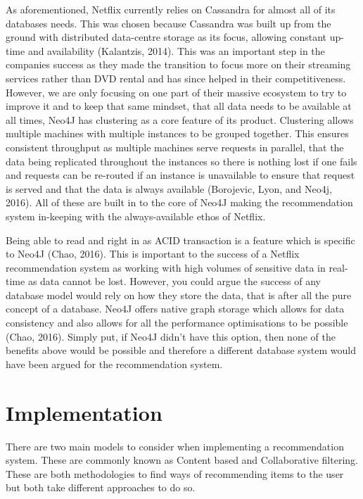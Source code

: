\documentclass[a4paper]{article}
\begin{document}
As aforementioned, Netflix currently relies on Cassandra for almost all of its databases needs. This was chosen because Cassandra was built up from the ground with distributed data-centre storage as its focus, allowing constant up-time and availability (Kalantzis, 2014). This was an important step in the companies success as they made the transition to focus more on their streaming services rather than DVD rental and has since helped in their competitiveness. However, we are only focusing on one part of their massive ecosystem to try to improve it and to keep that same mindset, that all data needs to be available at all times, Neo4J has clustering as a core feature of its product. Clustering allows multiple machines with multiple instances to be grouped together. This ensures consistent throughput as multiple machines serve requests in parallel, that the data being replicated throughout the instances so there is nothing lost if one fails and requests can be re-routed if an instance is unavailable to ensure that request is served and that the data is always available (Borojevic, Lyon, and Neo4j, 2016). All of these are built in to the core of Neo4J making the recommendation system in-keeping with the always-available ethos of Netflix. \par

Being able to read and right in as ACID transaction is a feature which is specific to Neo4J (Chao, 2016). This is important to the success of a Netflix recommendation system as working with high volumes of sensitive data in real-time as data cannot be lost. However, you could argue the success of any database model would rely on how they store the data, that is after all the pure concept of a database. Neo4J offers native graph storage which allows for data consistency and also allows for all the performance optimisations to be possible (Chao, 2016). Simply put, if Neo4J didn't have this option, then none of the benefits above would be possible and therefore a different database system would have been argued for the recommendation system. \par


\section{Implementation}
\label{sec:Implementation}

There are two main models to consider when implementing a recommendation system. These are commonly known as Content based and Collaborative filtering. These are both methodologies to find ways of recommending items to the user but both take different approaches to do so.
\end{document}
